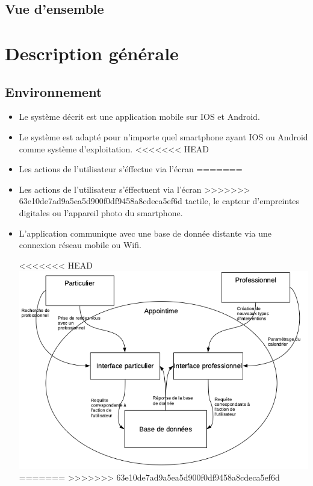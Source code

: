 \documentclass{article}
\begin{document}
\begin{itemize}
\subsection{Vue d'ensemble}


\section{Description générale}
\subsection{Environnement}
\begin{itemize}
\item Le système décrit est une application mobile sur IOS et
Android.
\item Le système est adapté pour n'importe quel smartphone ayant IOS ou Android comme
système d'exploitation.
<<<<<<< HEAD
\item Les actions de l'utilisateur s'éffectue via l'écran
=======
\item Les actions de l'utilisateur s'éffectuent via l'écran
>>>>>>> 63e10de7ad9a5ea5d900f0df9458a8cdeca5ef6d
  tactile, le capteur d'empreintes digitales ou l'appareil photo du smartphone.
\item L'application communique avec une base de donnée distante
  via une connexion \og réseau mobile\fg{} ou Wifi.


<<<<<<< HEAD
\includegraphics[scale=0.5]{ShematDiagrammes/ShematGeneral.png}
=======
>>>>>>> 63e10de7ad9a5ea5d900f0df9458a8cdeca5ef6d
\end{itemize}

\end{itemize}
\end{document}
